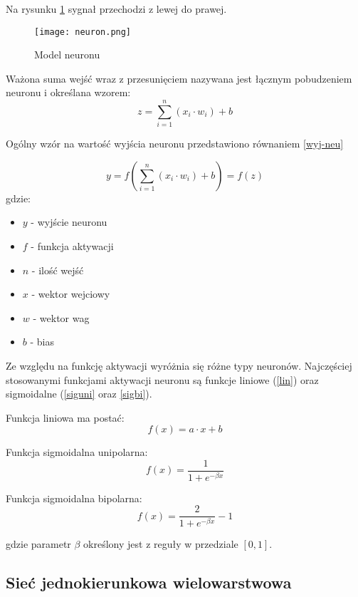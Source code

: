 \documentclass[12pt,twoside]{article}
\begin{document}
Na rysunku \ref{neuron} sygnał przechodzi z lewej do prawej.

\begin{figure}[ht]
\label{neuron}
\centering
\texttt{[image: neuron.png]}
\caption{Model neuronu}
\end{figure}

Ważona suma wejść wraz z przesunięciem nazywana jest łącznym pobudzeniem neuronu i określana wzorem:
\begin{equation}\label{pobudzenie}
z = \sum_{i=1}^{n}(x_i \cdot w_i) + b 
\end{equation}

Ogólny wzór na wartość wyjścia neuronu przedstawiono równaniem \ref{wyj-neu}

\begin{equation}\label{wyj-neu}
y = f \left(  \sum_{i=1}^{n}(x_i \cdot w_i) + b \right) = f(z)
\end{equation}
gdzie:
\begin{itemize}
\item $y$ - wyjście neuronu
\item $f$ - funkcja aktywacji
\item $n$ - ilość wejść
\item $x$ - wektor wejciowy
\item $w$ - wektor wag
\item $b$  - bias
\end{itemize}
Ze względu na funkcję aktywacji wyróżnia się różne typy neuronów. Najczęściej stosowanymi funkcjami aktywacji neuronu są funkcje liniowe (\ref{lin}) oraz sigmoidalne (\ref{siguni} oraz \ref{sigbi}).


Funkcja liniowa ma postać:
\begin{equation}\label{lin}
f(x) = a \cdot x + b
\end{equation}

Funkcja sigmoidalna unipolarna:
\begin{equation}\label{siguni}
f(x) = \frac{1}{1 + e^{-\beta x}}
\end{equation}

Funkcja sigmoidalna bipolarna:
\begin{equation}\label{sigbi}
f(x) = \frac{2}{1 + e^{-\beta x}} -1
\end{equation}

gdzie parametr $\beta$ określony jest z reguły w przedziale $[0, 1]$.
\clearpage

\subsection{Sieć jednokierunkowa wielowarstwowa}
\end{document}
